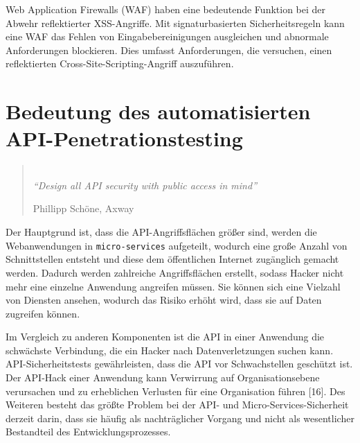 Web Application Firewalls (WAF) haben eine bedeutende Funktion bei der Abwehr reflektierter XSS-Angriffe. Mit signaturbasierten Sicherheitsregeln kann eine WAF das Fehlen von Eingabebereinigungen ausgleichen und abnormale Anforderungen blockieren. Dies umfasst Anforderungen, die versuchen, einen reflektierten Cross-Site-Scripting-Angriff auszuführen\cite{xssreflected16}.

\newpage

\section{Bedeutung des automatisierten API-Penetrationstesting}

\begin{quote}
	\emph{\\
		"`Design all API security with public access in mind"'}
	\begin{flushright}
		Phillipp Schöne, Axway
	\end{flushright}
\end{quote}

Der Hauptgrund ist, dass die API-Angriffsflächen größer sind, werden die Webanwendungen in \texttt{micro-services} aufgeteilt, wodurch eine große Anzahl von Schnittstellen entsteht und diese dem öffentlichen Internet zugänglich gemacht werden. Dadurch werden zahlreiche Angriffsflächen erstellt, sodass Hacker nicht mehr eine einzelne Anwendung angreifen müssen. Sie können sich eine Vielzahl von Diensten ansehen, wodurch das Risiko erhöht wird, dass sie auf Daten zugreifen können\cite{mswv17}. 

Im Vergleich zu anderen Komponenten ist die API in einer Anwendung die schwächste Verbindung, die ein Hacker nach Datenverletzungen suchen kann. API-Sicherheitstests gewährleisten, dass die API vor Schwachstellen geschützt ist. Der API-Hack einer Anwendung kann Verwirrung auf Organisationsebene verursachen und zu erheblichen Verlusten für eine Organisation führen [16]. Des Weiteren besteht das größte Problem bei der API- und Micro-Services-Sicherheit derzeit darin, dass sie häufig als nachträglicher Vorgang und nicht als wesentlicher Bestandteil des Entwicklungsprozesses\cite{anthonyart18}.

